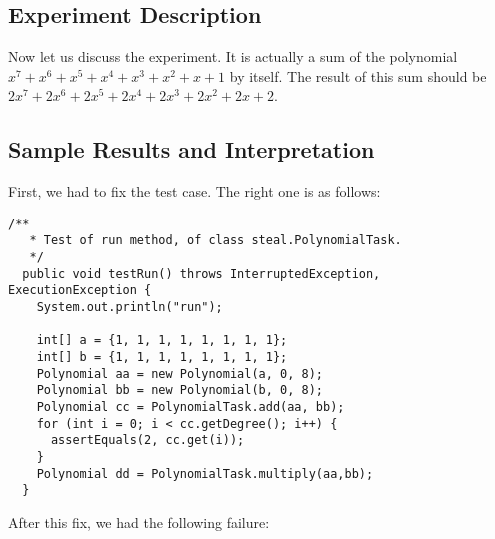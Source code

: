 \subsection{Experiment Description}
\par
Now let us discuss the experiment. It is actually a sum of the
polynomial $x^7+x^6+x^5+x^4+x^3+x^2+x+1$ by itself. The result of this
sum should be $2x^7+2x^6+2x^5+2x^4+2x^3+2x^2+2x+2$. 
\par
\subsection{Sample Results and Interpretation}
\par
First, we had to fix the test case. The right one is as follows:
\par
\hfill
\begin{lstlisting}[style=numbers]
  /** 
   * Test of run method, of class steal.PolynomialTask.
   */
  public void testRun() throws InterruptedException, ExecutionException {
    System.out.println("run");
    
    int[] a = {1, 1, 1, 1, 1, 1, 1, 1}; 
    int[] b = {1, 1, 1, 1, 1, 1, 1, 1}; 
    Polynomial aa = new Polynomial(a, 0, 8); 
    Polynomial bb = new Polynomial(b, 0, 8); 
    Polynomial cc = PolynomialTask.add(aa, bb);
    for (int i = 0; i < cc.getDegree(); i++) {
      assertEquals(2, cc.get(i));
    }   
    Polynomial dd = PolynomialTask.multiply(aa,bb);
  }
\end{lstlisting}
\hfill
\par
After this fix, we had the following failure:
\par
\hfill
